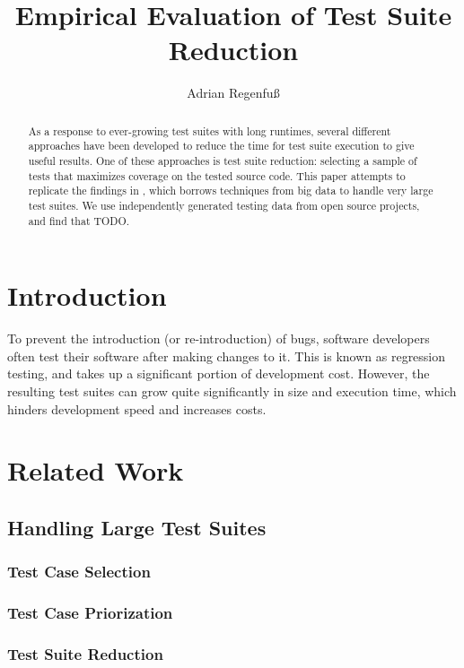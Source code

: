 \documentclass[a4paper,10pt]{article}
\title{Empirical Evaluation of Test Suite Reduction}
\author{Adrian Regenfuß}
\begin{document}
\maketitle

\tableofcontents
\newpage

\begin{abstract}
As a response to ever-growing test suites with long runtimes, several
different approaches have been developed to reduce the time for test
suite execution to give useful results. One of these approaches is test
suite reduction: selecting a sample of tests that maximizes coverage on
the tested source code. This paper attempts to replicate the findings
in \citealt{cruciani2019scalable}, which borrows techniques from big
data to handle very large test suites. We use independently generated
testing data from open source projects, and find that TODO.
\end{abstract}

\section{Introduction}

To prevent the introduction (or re-introduction) of bugs, software
developers often test their software after making changes to it.
This is known as regression testing, and takes up a significant portion
of development cost. However, the resulting test suites can grow quite
significantly in size and execution time, which hinders development
speed and increases costs.

\section{Related Work}

\subsection{Handling Large Test Suites}

\subsubsection{Test Case Selection}

\subsubsection{Test Case Priorization}

\subsubsection{Test Suite Reduction}
\end{document}
